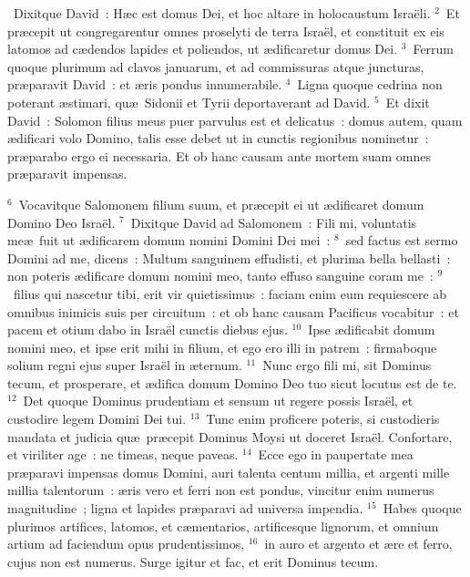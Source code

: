 ~Dixitque David~: H\ae c est domus Dei, et hoc altare in holocaustum Isra\"eli.
${}^{2}$~Et pr\ae cepit ut congregarentur omnes proselyti de terra Isra\"el, et constituit ex eis latomos ad c\ae dendos lapides et poliendos, ut \ae dificaretur domus Dei.
${}^{3}$~Ferrum quoque plurimum ad clavos januarum, et ad commissuras atque juncturas, pr\ae paravit David~: et \ae ris pondus innumerabile.
${}^{4}$~Ligna quoque cedrina non poterant \ae stimari, qu\ae\ Sidonii et Tyrii deportaverant ad David.
${}^{5}$~Et dixit David~: Solomon filius meus puer parvulus est et delicatus~: domus autem, quam \ae dificari volo Domino, talis esse debet ut in cunctis regionibus nominetur~: pr\ae parabo ergo ei necessaria. Et ob hanc causam ante mortem suam omnes pr\ae paravit impensas.


${}^{6}$~Vocavitque Salomonem filium suum, et pr\ae cepit ei ut \ae dificaret domum Domino Deo Isra\"el.
${}^{7}$~Dixitque David ad Salomonem~: Fili mi, voluntatis me\ae\ fuit ut \ae dificarem domum nomini Domini Dei mei~:
${}^{8}$~sed factus est sermo Domini ad me, dicens~: Multum sanguinem effudisti, et plurima bella bellasti~: non poteris \ae dificare domum nomini meo, tanto effuso sanguine coram me~:
${}^{9}$~filius qui nascetur tibi, erit vir quietissimus~: faciam enim eum requiescere ab omnibus inimicis suis per circuitum~: et ob hanc causam Pacificus vocabitur~: et pacem et otium dabo in Isra\"el cunctis diebus ejus.
${}^{10}$~Ipse \ae dificabit domum nomini meo, et ipse erit mihi in filium, et ego ero illi in patrem~: firmaboque solium regni ejus super Isra\"el in \ae ternum.
${}^{11}$~Nunc ergo fili mi, sit Dominus tecum, et prosperare, et \ae difica domum Domino Deo tuo sicut locutus est de te.
${}^{12}$~Det quoque Dominus prudentiam et sensum ut regere possis Isra\"el, et custodire legem Domini Dei tui.
${}^{13}$~Tunc enim proficere poteris, si custodieris mandata et judicia qu\ae\ pr\ae cepit Dominus Moysi ut doceret Isra\"el. Confortare, et viriliter age~: ne timeas, neque paveas.
${}^{14}$~Ecce ego in paupertate mea pr\ae paravi impensas domus Domini, auri talenta centum millia, et argenti mille millia talentorum~: \ae ris vero et ferri non est pondus, vincitur enim numerus magnitudine~; ligna et lapides pr\ae paravi ad universa impendia.
${}^{15}$~Habes quoque plurimos artifices, latomos, et c\ae mentarios, artificesque lignorum, et omnium artium ad faciendum opus prudentissimos,
${}^{16}$~in auro et argento et \ae re et ferro, cujus non est numerus. Surge igitur et fac, et erit Dominus tecum.


